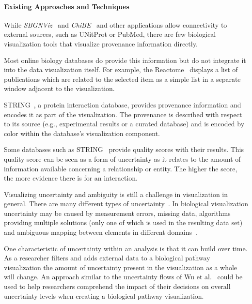 \documentclass[twocolumn]{bmcart}%
\begin{document}
\paragraph*{Existing Approaches and Techniques}

While \textit{SBGNViz}~\cite{SBGNViz2015} and \textit{ChiBE}~\cite{Babur2010chibe} and other applications allow connectivity to external sources, such as UNitProt or PubMed, there are few biological visualization tools that visualize provenance information directly.

Most online biology databases do provide this information but do not integrate it into the data visualization itself.
For example, the Reactome~\cite{croft2014reactome} displays a list of publications which are related to the selected item as a simple list in a separate window adjacent to the visualization.

STRING~\cite{STRING2005}, a protein interaction database, provides provenance information and encodes it as part of the visualization.
The provenance is described with respect to its source (e.g., experimental results or a curated database) and is encoded by color within the database's visualization component.

Some databases such as STRING~\cite{STRING2005} provide quality scores with their results.
This quality score can be seen as a form of uncertainty as it relates to the amount of information available concerning a relationship or entity.
The higher the score, the more evidence there is for an interaction.

Visualizing uncertainty and ambiguity is still a challenge in visualization in general.
There are many different types of uncertainty~\cite{skeels2010uncertainty}.
In biological visualization uncertainty may be caused by measurement errors, missing data, algorithms providing multiple solutions (only one of which is used in the resulting data set) and ambiguous mapping between elements in different domains~\cite{kohlbacher2014multivariate}.

One characteristic of uncertainty within an analysis is that it can build over time.
As a researcher filters and adds external data to a biological pathway visualization the amount of uncertainty present in the visualization as a whole will change.
An approach similar to the uncertainty flows of Wu et al.~\cite{wu2012uncertainty} could be used to help researchers comprehend the impact of their decisions on overall uncertainty levels when creating a biological pathway visualization.
\end{document}
